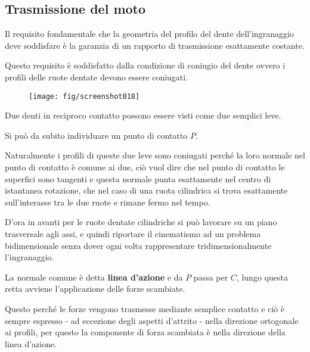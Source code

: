 \documentclass[a4paper, 15pt]{article}
\begin{document}
\subsection{Trasmissione del moto}
\begin{adjustwidth}{2in}{}	 
	Il requisito fondamentale che la geometria del profilo del
	dente dell'ingranaggio deve soddisfare è la garanzia di un
	rapporto di trasmissione esattamente costante.\newline 
	
	Questo requisito è soddisfatto dalla condizione di coniugio del dente ovvero i profili delle ruote dentate devono essere coniugati.	
	\begin{figure}[H]
		\centering
		\texttt{[image: fig/screenshot018]}
		\label{fig:screenshot018}
	\end{figure}	
	Due denti in reciproco contatto possono essere visti come due semplici leve. 
	
	Si può da subito individuare un punto di contatto $P$. 
	
	Naturalmente i profili di queste due leve sono coniugati perché la loro normale nel punto di contatto è comune ai due, ciò vuol dire che nel punto di contatto le superfici sono tangenti e questa normale punta esattamente nel centro di istantanea rotazione, che nel caso di una ruota cilindrica si trova esattamente sull'interasse tra le due ruote e rimane fermo nel tempo.
	
	D'ora in avanti per le ruote dentate cilindriche si può lavorare su un piano trasversale agli assi, e quindi riportare il cinematismo ad un problema bidimensionale senza dover ogni volta rappresentare tridimensionalmente l'ingranaggio.\newline
	
	La normale comune è detta \textbf{linea d'azione} e da $P$ passa per $C$, lungo questa retta avviene l'applicazione delle forze scambiate.
	
	Questo perché le forze vengono trasmesse mediante semplice contatto e ciò è sempre espresso - ad eccezione degli aspetti d'attrito - nella direzione ortogonale ai profili, per questo la componente di forza scambiata è nella direzione della linea d'azione.
\end{adjustwidth}
\newpage
\end{document}
